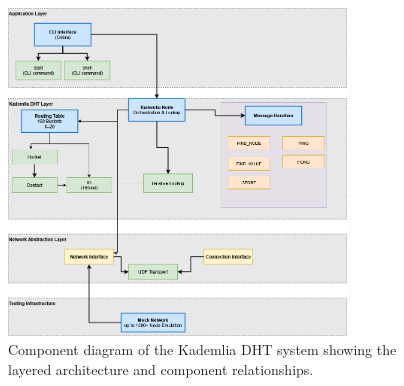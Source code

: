 \begin{figure}[htbp]
    \centering
    \includegraphics[width=0.8\textwidth]{Images/component_diagram.drawio.png}
    \caption{Component diagram of the Kademlia DHT system showing the layered architecture and component relationships.}
    \label{fig:architecture}
\end{figure}

